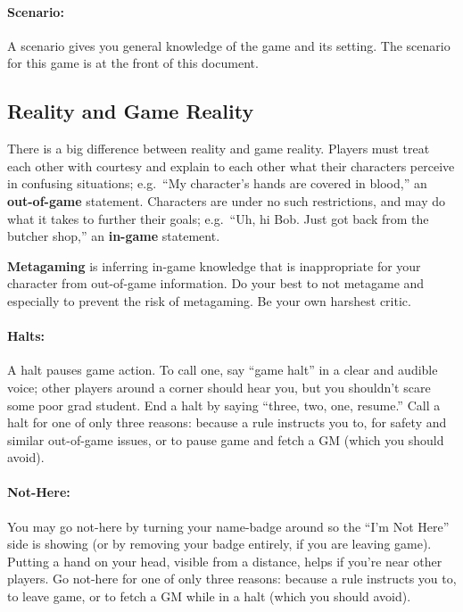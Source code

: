 \documentclass[sheet]{airship}
\begin{document}
\paragraph{Scenario:} A scenario gives you general knowledge of the
game and its setting. The scenario for this game is at the front of this document.

\subsection{Reality and Game Reality}

There is a big difference between reality and game reality.  Players
must treat each other with courtesy and explain to each other what
their characters perceive in confusing situations; e.g.\ ``My
character's hands are covered in blood,'' an {\bf out-of-game}
statement.  Characters are under no such restrictions, and may do what
it takes to further their goals; e.g.\ ``Uh, hi Bob.  Just got back
from the butcher shop,'' an {\bf in-game} statement.

{\bf Metagaming} is inferring in-game knowledge that is inappropriate
for your character from out-of-game information.  Do your best to not
metagame and especially to prevent the risk of metagaming.  Be your
own harshest critic.

\paragraph{Halts:} A halt pauses game action.  To call one, say ``game
halt'' in a clear and audible voice; other players around a corner
should hear you, but you shouldn't scare some poor grad student.  End
a halt by saying ``three, two, one, resume.''  Call a halt for one of
only three reasons: because a rule instructs you to, for safety and
similar out-of-game issues, or to pause game and fetch a GM (which you
should avoid).

\paragraph{Not-Here:} You may go not-here by turning your name-badge
around so the ``I'm Not Here'' side is showing (or by removing your
badge entirely, if you are leaving game).  Putting a hand on your
head, visible from a distance, helps if you're near other players.  Go
not-here for one of only three reasons: because a rule instructs you
to, to leave game, or to fetch a GM while in a halt (which you should
avoid).
\end{document}
